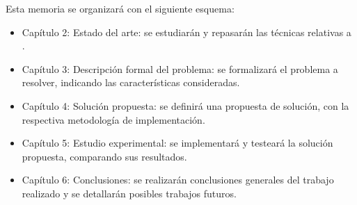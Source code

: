 Esta memoria se organizará con el siguiente esquema:
\begin{itemize}
	\item Capítulo 2: Estado del arte: se estudiarán y repasarán las técnicas relativas a .
	\item Capítulo 3: Descripción formal del problema: se formalizará el problema a resolver, indicando las características consideradas.
	\item Capítulo 4: Solución propuesta: se definirá una propuesta de solución, con la respectiva metodología de implementación. 
	\item Capítulo 5: Estudio experimental: se implementará y testeará la solución propuesta, comparando sus resultados.
	\item Capítulo 6: Conclusiones: se realizarán conclusiones generales del trabajo realizado y se detallarán posibles trabajos futuros.
\end{itemize}
